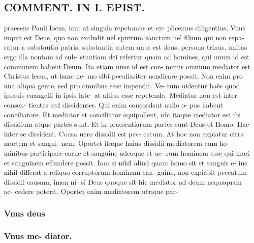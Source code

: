 \documentclass{article}
\begin{document}
\begin{pages}
\section*{COMMENT. IN I. EPIST. }\pstart praesens Pauli locus, iam ut singula repetamus et ex- plicemus diligentius, Vnus inquit est Deus, quo non excludit uel spiritum sanctum uel filium qui non sepa- ratur a substautia patris, substantia autem unus est deus, persona trinus, unitas ergo illa nontam ad sub- stantiam dei refertur quam ad homines, qui unum id est communem habent Deum. Ita etiam unus id est con- munis omnium mediator est Christus Iesus, ut hunc ne- mo sibi peculiariter uendicare possit. Non enim pro una aliqua gente, sed pro omnibus sese impendit. Ve- rum uidentur haẽc quod ipsauis euangelii in ipsis late- at altius esse repetenda. Mediator non est inter consen- tientes sed dissidentes. Qui enim concordant nullo o- pus habent conciliatore. Et mediator et conciliator equipollent, ubi itaque mediator est ibi dissidium atque partes sunt. Et in praesentiarum partes sunt Deus et Homo. Hae inter se dissident. Causa uero dissidii est pec- catum. At hoc non expiatur citra mortem et sangui- nem. Oportet itaque huius dissidii mediatorem cum ho- minibus participare carne et sanguine adeoque et ue- rum hominem esse qui mori et sanguinem effundere possit. Iam si nihil aliud quam homo sit et sanguis e- ius nihil differat a reliquo corruptorum hominum san- guine, non expiabit peccatum dissidii causam, imon ni- si Deus quoque sit hic mediator ad deum nequaquam ac- cedere poterit. Oportet enim mediatorem utrique par-  \pend
\subsubsection*{Vnus deus }
\subsubsection*{Vnus me- diator. }

\end{pages}
\end{document}
